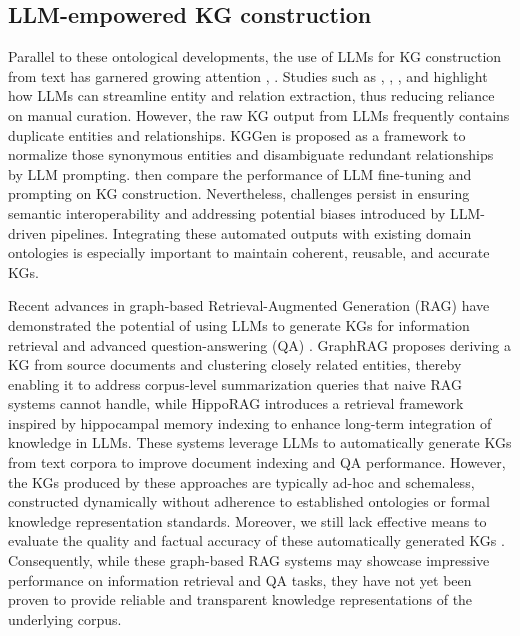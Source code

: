 \documentclass[preprint,12pt]{elsarticle}
\begin{document}
\subsection{LLM-empowered KG construction}\label{sec2_2}
Parallel to these ontological developments, the use of LLMs for KG construction from text has garnered growing attention \citep{10.1109/TKDE.2024.3352100}, \citep{bian2025llmempoweredknowledgegraphconstruction}. Studies such as \citep{zhang-soh-2024-extract}, \citep{regino2024generating}, \citep{doi:10.3233/SW-243719}, and \citep{carta2023iterativezeroshotllmprompting} highlight how LLMs can streamline entity and relation extraction, thus reducing reliance on manual curation. However, the raw KG output from LLMs frequently contains duplicate entities and relationships. KGGen \citep{mo2025kggenextractingknowledgegraphs} is proposed as a framework to normalize those synonymous entities and disambiguate redundant relationships by LLM prompting. \citet{ghanem:hal-04862235} then compare the performance of LLM fine-tuning and prompting on KG construction. Nevertheless, challenges persist in ensuring semantic interoperability and addressing potential biases introduced by LLM-driven pipelines. Integrating these automated outputs with existing domain ontologies is especially important to maintain coherent, reusable, and accurate KGs.

Recent advances in graph-based Retrieval-Augmented Generation (RAG) have demonstrated the potential of using LLMs to generate KGs for information retrieval and advanced question-answering (QA) \citep{han2025retrievalaugmentedgenerationgraphsgraphrag}. GraphRAG \citep{edge2025localglobalgraphrag} proposes deriving a KG from source documents and clustering closely related entities, thereby enabling it to address corpus-level summarization queries that naive RAG systems cannot handle, while HippoRAG \citep{10.5555/3737916.3739818} introduces a retrieval framework inspired by hippocampal memory indexing to enhance long-term integration of knowledge in LLMs. These systems leverage LLMs to automatically generate KGs from text corpora to improve document indexing and QA performance. However, the KGs produced by these approaches are typically ad-hoc and schemaless, constructed dynamically without adherence to established ontologies or formal knowledge representation standards. Moreover, we still lack effective means to evaluate the quality and factual accuracy of these automatically generated KGs \citep{xiang2025usegraphsragcomprehensive}. Consequently, while these graph-based RAG systems may showcase impressive performance on information retrieval and QA tasks, they have not yet been proven to provide reliable and transparent knowledge representations of the underlying corpus.
\end{document}
